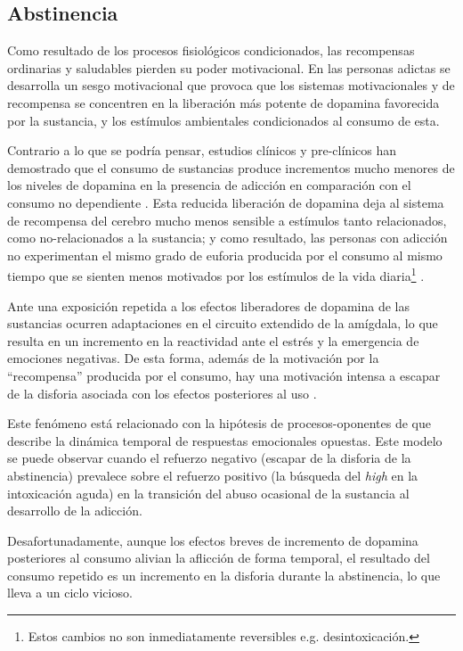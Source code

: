 \subsection{Abstinencia}
\label{abst}
Como resultado de los procesos fisiológicos condicionados, las recompensas ordinarias y saludables pierden su poder motivacional.
En las personas adictas se desarrolla un sesgo motivacional que provoca que los sistemas motivacionales y de recompensa se concentren en la liberación más potente de dopamina favorecida por la sustancia, y los estímulos ambientales condicionados al consumo de esta\parencite{Volkow2016}.\par
Contrario a lo que se podría pensar, estudios clínicos y pre-clínicos han demostrado que el consumo de sustancias produce incrementos mucho menores de los niveles de dopamina en la presencia de adicción en comparación con el consumo no dependiente \parencite{Volkow1997,Zhang2013,Volkow2014}.
Esta reducida liberación de dopamina deja al sistema de recompensa del cerebro mucho menos sensible a estímulos tanto relacionados, como no-relacionados a la sustancia; y como resultado, las personas con adicción no experimentan el mismo grado de euforia producida por el consumo al mismo tiempo que se sienten menos motivados por los estímulos de la vida diaria\footnote{Estos cambios no son inmediatamente reversibles e.g. desintoxicación.} \parencite{Volkow2016}.\par
Ante una exposición repetida a los efectos liberadores de dopamina de las sustancias ocurren adaptaciones en el circuito extendido de la amígdala, lo que resulta en un incremento en la reactividad ante el estrés y la emergencia de emociones negativas.
De esta forma, además de la motivación por la ``recompensa'' producida por el consumo, hay una motivación intensa a escapar de la disforia asociada con los efectos posteriores al uso \parencite{Goldstein2012a,Volkow2016}.\par
Este fenómeno está relacionado con la hipótesis de procesos-oponentes de \textcite{Solomon1978} que describe la dinámica temporal de respuestas emocionales opuestas.
Este modelo se puede observar cuando el refuerzo negativo (escapar de la disforia de la abstinencia) prevalece sobre el refuerzo positivo (la búsqueda del \textit{high} en la intoxicación aguda) en la transición del abuso ocasional de la sustancia al desarrollo de la adicción.\par
Desafortunadamente, aunque los efectos breves de incremento de dopamina posteriores al consumo alivian la aflicción de forma temporal, el resultado del consumo repetido es un incremento en la disforia durante la abstinencia, lo que lleva a un ciclo vicioso.

